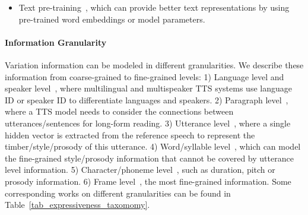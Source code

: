 \documentclass{article}
\begin{document}
\begin{itemize}[leftmargin=*]
\item Text pre-training~\cite{fang2019towards,hayashi2019pre,xiao2020improving,jia2021png,guo2019exploiting,zhou2021dependency}, which can provide better text representations by using pre-trained word embeddings or model parameters.


\end{itemize}


\paragraph{Information Granularity} Variation information can be modeled in different granularities. We describe these information from coarse-grained to fine-grained levels: 1) Language level and speaker level~\cite{zhang2019learning,nekvinda2020one,chen2020multispeech}, where multilingual and multispeaker TTS systems use language ID or speaker ID to differentiate languages and speakers. 2) Paragraph level~\cite{aubin2019improving,xu2020improving,wang2020s}, where a TTS model needs to consider the connections between utterances/sentences for long-form reading. 3) Utterance level~\cite{skerry2018towards,wang2018style,jia2018transfer,stanton2018predicting,liu2020expressive,chen2021adaspeech}, where a single hidden vector is extracted from the reference speech to represent the timber/style/prosody of this utterance. 4) Word/syllable level~\cite{sun2020fully,hono2020hierarchical,chien2021hierarchical,talman2019predicting}, which can model the fine-grained style/prosody information that cannot be covered by utterance level information. 5) Character/phoneme level~\cite{lee2019robust,sun2020generating,zeng2020prosody,sun2020fully,chien2021hierarchical,chen2021adaspeech,lei2021fine}, such as duration, pitch or prosody information. 6) Frame level~\cite{lee2019robust,kenter2019chive,choi2020attentron,zhang2020denoising}, the most fine-grained information. Some corresponding works on different granularities can be found in Table~\ref{tab_expressiveness_taxomomy}. 
\end{document}
